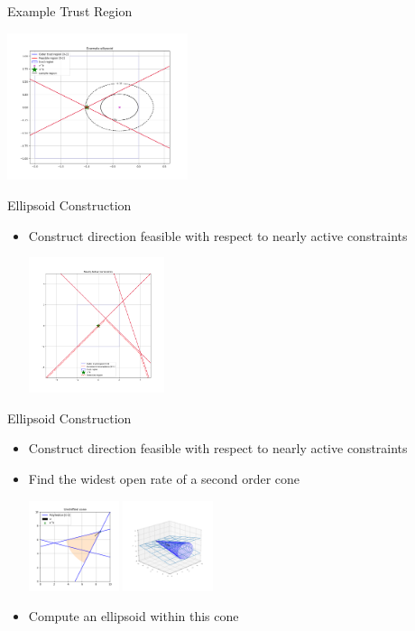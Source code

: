 \documentclass{beamer}
\begin{document}
\begin{frame}{Example Trust Region}
	\begin{center}
		\includegraphics[width=200px]{images/example_ellipsoid.png}
	\end{center}
\end{frame}


\begin{frame}{Ellipsoid Construction}
	\begin{itemize}
		\item Construct direction feasible with respect to nearly active constraints
		\begin{center}
			\includegraphics[width=150px]{images/active_constraints.png}
		\end{center}
	\end{itemize}
\end{frame}

\begin{frame}{Ellipsoid Construction}
	\begin{itemize}
		\item Construct direction feasible with respect to nearly active constraints
		\item Find the widest open rate of a second order cone
		\begin{center}
			\includegraphics[width=100px]{images/unshifted_cone.png}
			\includegraphics[width=100px]{images/second_order_cone.png}
		\end{center}
		\item Compute an ellipsoid within this cone
	\end{itemize}
\end{frame}
\end{document}
